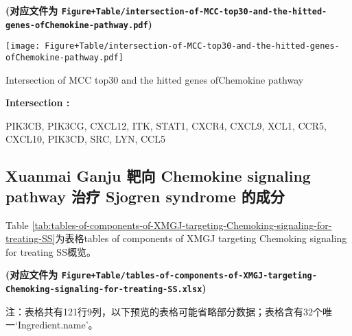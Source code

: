 \documentclass[
]{article}
\begin{document}
\textbf{(对应文件为 \texttt{Figure+Table/intersection-of-MCC-top30-and-the-hitted-genes-ofChemokine-pathway.pdf})}

\def\@captype{figure}
\begin{center}
\texttt{[image: Figure+Table/intersection-of-MCC-top30-and-the-hitted-genes-ofChemokine-pathway.pdf]}
\caption{Intersection of MCC top30 and the hitted genes ofChemokine pathway}\label{fig:intersection-of-MCC-top30-and-the-hitted-genes-ofChemokine-pathway}
\end{center}

\begin{center}\begin{tcolorbox}[colback=gray!10, colframe=gray!50, width=0.9\linewidth, arc=1mm, boxrule=0.5pt]
\textbf{
Intersection
:}

\vspace{0.5em}

    PIK3CB, PIK3CG, CXCL12, ITK, STAT1, CXCR4, CXCL9, XCL1,
CCR5, CXCL10, PIK3CD, SRC, LYN, CCL5

\vspace{2em}
\end{tcolorbox}
\end{center}

\hypertarget{xuanmai-ganju-ux9776ux5411-chemokine-signaling-pathway-ux6cbbux7597-sjogren-syndrome-ux7684ux6210ux5206}{%
\subsection{Xuanmai Ganju 靶向 Chemokine signaling pathway 治疗 Sjogren syndrome 的成分}\label{xuanmai-ganju-ux9776ux5411-chemokine-signaling-pathway-ux6cbbux7597-sjogren-syndrome-ux7684ux6210ux5206}}

Table \ref{tab:tables-of-components-of-XMGJ-targeting-Chemoking-signaling-for-treating-SS}为表格tables of components of XMGJ targeting Chemoking signaling for treating SS概览。

\textbf{(对应文件为 \texttt{Figure+Table/tables-of-components-of-XMGJ-targeting-Chemoking-signaling-for-treating-SS.xlsx})}

\begin{center}\begin{tcolorbox}[colback=gray!10, colframe=gray!50, width=0.9\linewidth, arc=1mm, boxrule=0.5pt]注：表格共有121行9列，以下预览的表格可能省略部分数据；表格含有32个唯一`Ingredient.name'。
\end{tcolorbox}
\end{center}
\end{document}
